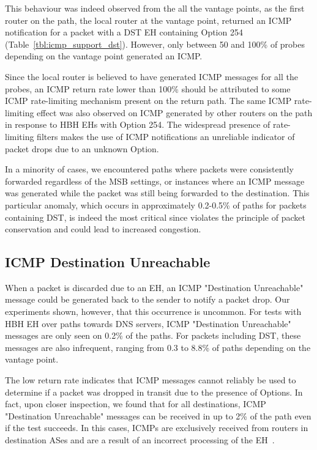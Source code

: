 \documentclass[conference]{IEEEtran}
\begin{document}
This behaviour was indeed observed from the all the vantage points, as the
first router on the path, the local router at the vantage point, returned an
ICMP notification for a packet with a DST EH containing Option 254
(Table~\ref{tbl:icmp_support_dst}).  However, only between 50 and 100\% of
probes depending on the vantage point generated an ICMP.

Since the local router is believed to have generated ICMP messages for all the
probes, an ICMP return rate lower than 100\% should be attributed to some ICMP
rate-limiting mechanism present on the return path.  The same ICMP
rate-limiting effect was also observed on ICMP generated by other routers on
the path in response to HBH EHs with Option 254.  The widespread presence of
rate-limiting filters makes the use of ICMP notifications an unreliable
indicator of packet drops due to an unknown Option.

In a minority of cases, we encountered paths where packets were consistently
forwarded regardless of the MSB settings, or instances where an ICMP message
was generated while the packet was still being forwarded to the destination.
This particular anomaly, which occurs in approximately 0.2-0.5\% of paths for
packets containing DST, is indeed the most critical since violates the
principle of packet conservation and could lead to increased congestion. 


\subsection{ICMP Destination Unreachable}

When a packet is discarded due to an EH, an ICMP "Destination Unreachable"
message could be generated back to the sender to notify a packet drop.  Our
experiments shown, however, that this occurrence is uncommon.  For tests with
HBH EH over paths towards DNS servers, ICMP "Destination Unreachable" messages
are only seen on 0.2\% of the paths. For packets including DST, these messages
are also infrequent, ranging from 0.3 to 8.8\% of paths depending on the
vantage point. 

The low return rate indicates that ICMP messages cannot reliably be used to
determine if a packet was dropped in transit due to the presence of Options.
In fact, upon closer inspection, we found that for all destinations, ICMP
"Destination Unreachable" messages can be received in up to 2\% of the path
even if the test succeeds. In this cases, ICMPs are exclusively received from
routers in destination ASes and are a result of an incorrect processing of the
EH~\cite{RFC8200}.
\end{document}
